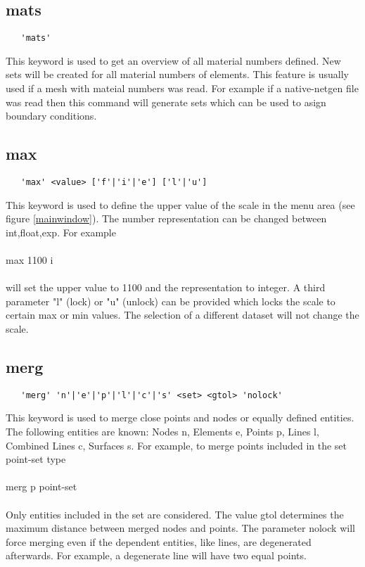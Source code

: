 \documentclass{article}
\begin{document}
\subsection{\label{mats}mats}
\begin{verbatim}
   'mats' 
\end{verbatim}
This keyword is used to get an overview of all material numbers defined. New sets will be created for all material numbers of elements. This feature is usually used if a mesh with mateial numbers was read. For example if a native-netgen file \cite{NETGEN} was read then this command will generate sets which can be used to asign boundary conditions.
 
\subsection{\label{max}max}
\begin{verbatim}
   'max' <value> ['f'|'i'|'e'] ['l'|'u']
\end{verbatim}
This keyword is used to define the upper value of the scale in the menu area (see figure \ref{mainwindow}). The number representation can be changed between int,float,exp. For example\\\\max 1100 i\\\\will set the upper value to 1100 and the representation to integer. A third parameter "l" (lock) or "u" (unlock) can be provided which locks the scale to certain max or min values. The selection of a different dataset will not change the scale.
 
\subsection{\label{merg}merg}
\begin{verbatim}
   'merg' 'n'|'e'|'p'|'l'|'c'|'s' <set> <gtol> 'nolock' 
\end{verbatim}
This keyword is used to merge close points and nodes or equally defined entities. The following entities are known: Nodes n, Elements e, Points p, Lines l, Combined Lines c, Surfaces s. For example, to merge points included in the set point-set type\\\\merg p point-set\\\\Only entities included in the set are considered. The value gtol determines the maximum distance between merged nodes and points. The parameter nolock will force merging even if the dependent entities, like lines, are degenerated afterwards. For example, a degenerate line will have two equal points.
 
\end{document}
